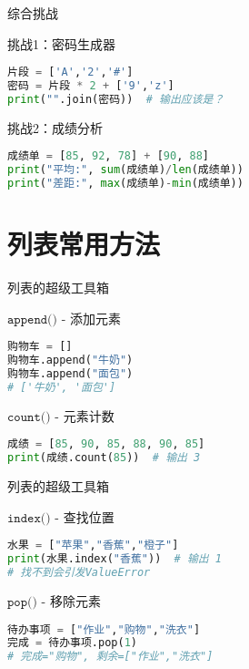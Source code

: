 \documentclass{beamer}
\begin{document}
\begin{frame}[fragile]{综合挑战}
\begin{block}{挑战1：密码生成器}
\begin{lstlisting}[language=Python]
片段 = ['A','2','#']
密码 = 片段 * 2 + ['9','z']
print("".join(密码))  # 输出应该是？
\end{lstlisting}
\end{block}

\begin{block}{挑战2：成绩分析}
\begin{lstlisting}[language=Python]
成绩单 = [85, 92, 78] + [90, 88]
print("平均:", sum(成绩单)/len(成绩单))
print("差距:", max(成绩单)-min(成绩单))
\end{lstlisting}
\end{block}
\end{frame}

\section{列表常用方法}

\begin{frame}[fragile]{列表的超级工具箱}

\begin{block}{$\texttt{append()}$ - 添加元素}
\begin{lstlisting}[language=Python]
购物车 = []
购物车.append("牛奶")
购物车.append("面包")
# ['牛奶', '面包']
\end{lstlisting}
\end{block}

\begin{block}{$\texttt{count()}$ - 元素计数}
\begin{lstlisting}[language=Python]
成绩 = [85, 90, 85, 88, 90, 85]
print(成绩.count(85))  # 输出 3
\end{lstlisting}
\end{block}
\end{frame}

\begin{frame}[fragile]{列表的超级工具箱}

\begin{block}{$\texttt{index()}$ - 查找位置}
\begin{lstlisting}[language=Python]
水果 = ["苹果","香蕉","橙子"]
print(水果.index("香蕉"))  # 输出 1
# 找不到会引发ValueError
\end{lstlisting}
\end{block}

\begin{block}{$\texttt{pop()}$ - 移除元素}
\begin{lstlisting}[language=Python]
待办事项 = ["作业","购物","洗衣"]
完成 = 待办事项.pop(1) 
# 完成="购物", 剩余=["作业","洗衣"]
\end{lstlisting}
\end{block}

\end{frame}
\end{document}
